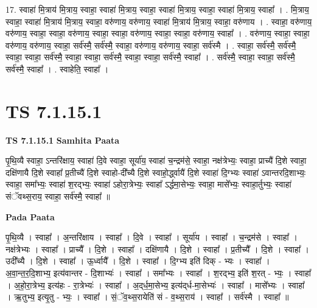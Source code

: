 \documentclass[17pt]{extarticle}
\begin{document}
17. स्वाहा॑ मि॒त्राय॑ मि॒त्राय॒ स्वाहा॒ स्वाहा॑ मि॒त्राय॒ स्वाहा॒ स्वाहा॑ मि॒त्राय॒ स्वाहा॒ स्वाहा॑ मि॒त्राय॒ स्वाहा᳚ । . मि॒त्राय॒ स्वाहा॒ स्वाहा॑ मि॒त्राय॑ मि॒त्राय॒ स्वाहा॒ वरु॑णाय॒ वरु॑णाय॒ स्वाहा॑ मि॒त्राय॑ मि॒त्राय॒ स्वाहा॒ वरु॑णाय । . स्वाहा॒ वरु॑णाय॒ वरु॑णाय॒ स्वाहा॒ स्वाहा॒ वरु॑णाय॒ स्वाहा॒ स्वाहा॒ वरु॑णाय॒ स्वाहा॒ स्वाहा॒ वरु॑णाय॒ स्वाहा᳚ । . वरु॑णाय॒ स्वाहा॒ स्वाहा॒ वरु॑णाय॒ वरु॑णाय॒ स्वाहा॒ सर्व॑स्मै॒ सर्व॑स्मै॒ स्वाहा॒ वरु॑णाय॒ वरु॑णाय॒ स्वाहा॒ सर्व॑स्मै । . स्वाहा॒ सर्व॑स्मै॒ सर्व॑स्मै॒ स्वाहा॒ स्वाहा॒ सर्व॑स्मै॒ स्वाहा॒ स्वाहा॒ सर्व॑स्मै॒ स्वाहा॒ स्वाहा॒ सर्व॑स्मै॒ स्वाहा᳚ । . सर्व॑स्मै॒ स्वाहा॒ स्वाहा॒ सर्व॑स्मै॒ सर्व॑स्मै॒ स्वाहा᳚ । . स्वाहेति॒ स्वाहा᳚ । \newline
\pagebreak
{}

\section{ TS 7.1.15.1 }

\textbf{TS 7.1.15.1 } \newline
\textbf{Samhita Paata} \newline

पृ॒थि॒व्यै स्वाहा॒ ऽन्तरि॑क्षाय॒ स्वाहा॑ दि॒वे स्वाहा॒ सूर्या॑य॒ स्वाहा॑ च॒न्द्रम॑से॒ स्वाहा॒ नक्ष॑त्रेभ्यः॒ स्वाहा॒ प्राच्यै॑ दि॒शे स्वाहा॒ दक्षि॑णायै दि॒शे स्वाहा᳚ प्र॒तीच्यै॑ दि॒शे स्वाहो-दी᳚च्यै दि॒शे स्वाहो॒र्द्ध्वायै॑ दि॒शे स्वाहा॑ दि॒ग्भ्यः स्वाहा॑ ऽवान्तरदि॒शाभ्यः॒ स्वाहा॒ समा᳚भ्यः॒ स्वाहा॑ श॒रद्भ्यः॒ स्वाहा॑ ऽहोरा॒त्रेभ्यः॒ स्वाहा᳚ ऽर्द्धमा॒सेभ्यः॒ स्वाहा॒ मासे᳚भ्यः॒ स्वाहा॒र्तुभ्यः॒ स्वाहा॑ संॅवथ्स॒राय॒ स्वाहा॒ सर्व॑स्मै॒ स्वाहा᳚ ॥ \newline

\textbf{Pada Paata} \newline

पृ॒थि॒व्यै । स्वाहा᳚ । अ॒न्तरि॑क्षाय । स्वाहा᳚ । दि॒वे । स्वाहा᳚ । सूर्या॑य । स्वाहा᳚ । च॒न्द्रम॑से । स्वाहा᳚ । नक्ष॑त्रेभ्यः । स्वाहा᳚ । प्राच्यै᳚ । दि॒शे । स्वाहा᳚ । दक्षि॑णायै । दि॒शे । स्वाहा᳚ । प्र॒तीच्यै᳚ । दि॒शे । स्वाहा᳚ । उदी᳚च्यै । दि॒शे । स्वाहा᳚ । ऊ॒र्ध्वायै᳚ । दि॒शे । स्वाहा᳚ । दि॒ग्भ्य इति॑ दिक् - भ्यः । स्वाहा᳚ । अ॒वा॒न्त॒र॒दि॒शाभ्य॒ इत्य॑वान्तर - दि॒शाभ्यः॑ । स्वाहा᳚ । समा᳚भ्यः । स्वाहा᳚ । श॒रद्भ्य॒ इति॑ श॒रत् - भ्यः॒ । स्वाहा᳚ । अ॒हो॒रा॒त्रेभ्य॒ इत्य॑हः - रा॒त्रेभ्यः॑ । स्वाहा᳚ । अ॒द्‌र्ध॒मा॒सेभ्य॒ इत्य॑द्‌र्ध-मा॒सेभ्यः॑ । स्वाहा᳚ । मासे᳚भ्यः । स्वाहा᳚ । ऋ॒तुभ्य॒ इत्यृ॒तु - भ्यः॒ । स्वाहा᳚ । सं॒ॅव॒थ्स॒रायेति॑ सं - व॒थ्स॒राय॑ । स्वाहा᳚ । सर्व॑स्मै । स्वाहा᳚ ॥  \newline
\end{document}
